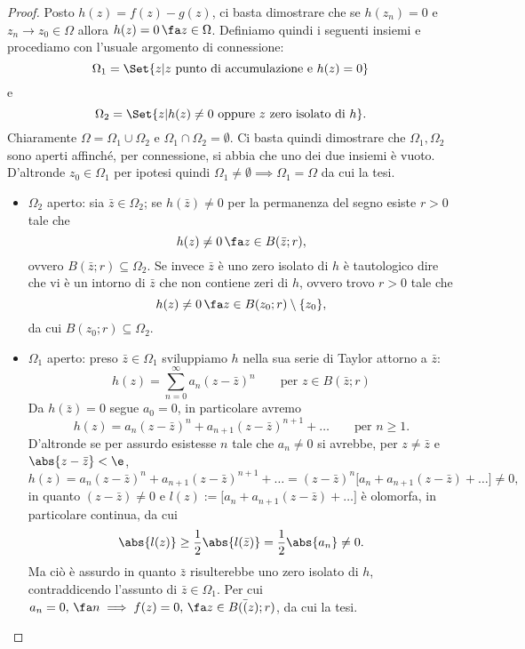 \begin{proof}
	Posto \(h(z)=f(z)-g(z)\), ci basta dimostrare che se \(h(z_n)=0\) e \(z_n\to z_0\in\Omega\) allora \(h(z)=0 \,\fa z\in\Omega\).
	Definiamo quindi i seguenti insiemi e procediamo con l'usuale argomento di connessione:
	\[
		\Omega_1 = \Set{z | z\text{ punto di accumulazione e }h(z)=0}
	\]
	e
	\[
		\Omega_2 = \Set{z | h(z)\neq 0 \text{ oppure \(z\) zero isolato di \(h\)}}.
	\]
	Chiaramente \(\Omega=\Omega_1\cup \Omega_2\) e \(\Omega_1 \cap \Omega_2=\emptyset\).
	Ci basta quindi dimostrare che \(\Omega_1,\Omega_2\) sono aperti affinché, per connessione, si abbia che uno dei due insiemi è vuoto. D'altronde \(z_0\in \Omega_1\) per ipotesi quindi \(\Omega_1 \neq \emptyset \implies \Omega_1=\Omega\) da cui la tesi.
	\begin{itemize}
		\item \(\Omega_2\) aperto: sia \(\bar{z}\in\Omega_2\); se \(h(\bar{z})\neq0\) per la permanenza del segno esiste \(r>0\) tale che
		      \[
			      h(z)\neq0 \,\fa z\in B(\bar{z};r),
		      \]
		      ovvero \(B(\bar{z};r)\subseteq \Omega_2\).
		      Se invece \(\bar{z}\) è uno zero isolato di \(h\) è tautologico dire che vi è un intorno di \(\bar{z}\) che non contiene zeri di \(h\), ovvero trovo \(r>0\) tale che
		      \[
			      h(z)\neq 0 \,\fa z\in B(z_0;r)\setminus\{z_0\},
		      \]
		      da cui \(B(z_0;r)\subseteq \Omega_2\).
		\item \(\Omega_1\) aperto: preso \(\bar{z}\in\Omega_1\) sviluppiamo \(h\) nella sua serie di Taylor attorno a \(\bar{z}\):
		      \[
			      h(z) = \sum_{n=0}^{\infty}a_n(z-\bar{z})^n \qquad\text{per }z\in B(\bar{z};r)
		      \]
		      Da \(h(\bar{z})=0\) segue \(a_0=0\), in particolare avremo
		      \[
			      h(z) = a_n(z-\bar{z})^n + a_{n+1}(z-\bar{z})^{n+1}+\ldots \qquad\text{per }n\ge 1.
		      \]
		      D'altronde se per assurdo esistesse \(n\) tale che \(a_n\neq 0\) si avrebbe, per \(z\neq \bar{z}\) e \(\abs{z-\bar{z}}<\e\),
		      \[
			      h(z) = a_n(z-\bar{z})^n + a_{n+1}(z-\bar{z})^{n+1}+\ldots = (z-\bar{z})^n \big[a_n+a_{n+1}(z-\bar{z})+\ldots\big] \neq 0,
		      \]
		      in quanto \((z-\bar{z})\neq 0\) e \(l(z):=\big[a_n+a_{n+1}(z-\bar{z})+\ldots\big]\) è olomorfa, in particolare continua, da cui
		      \[
			      \abs{l(z)} \ge \frac{1}{2}\abs{l(\bar{z})} = \frac{1}{2}\abs{a_n} \neq 0.
		      \]
		      Ma ciò è assurdo in quanto \(\bar{z}\) risulterebbe uno zero isolato di \(h\), contraddicendo l'assunto di \(\bar{z}\in\Omega_1\).
		      Per cui \(a_n=0,\,\fa n \implies f(z)=0,\,\fa z\in B(\bar(z);r)\), da cui la tesi.\qedhere
	\end{itemize}
\end{proof}


